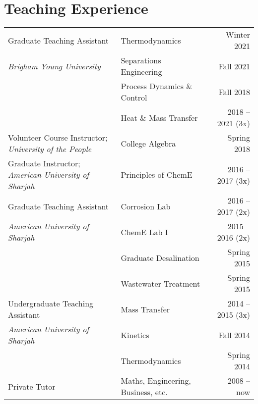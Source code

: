 \documentclass[letterpaper,11pt]{article}
\begin{document}
\section*{Teaching Experience}
\begin{tabular}{@{}p{}p{}r@{}}
     Graduate Teaching Assistant          & Thermodynamics                                      & Winter 2021 \\
      \textit{Brigham Young University}   & Separations Engineering                             & Fall 2021 \\
                                          & Process Dynamics \& Control                         & Fall 2018 \\
                                          & Heat \& Mass Transfer                               & 2018 -- 2021 (3x) \\[4pt]
     Volunteer Course Instructor; \textit{University of the People} & College Algebra           & Spring 2018 \\[4pt]
     Graduate Instructor; \textit{American University of Sharjah}   & Principles of ChemE       & 2016 -- 2017 (3x) \\[4pt]
     Graduate Teaching Assistant          & Corrosion Lab                                       & 2016 -- 2017 (2x) \\
     \textit{American University of Sharjah}                         
                                          & ChemE Lab I                                         & 2015 -- 2016 (2x) \\
                                          & Graduate Desalination                                        & Spring 2015 \\
                                          & Wastewater Treatment                                & Spring 2015 \\[4pt]
     Undergraduate Teaching Assistant     & Mass Transfer                                       & 2014 -- 2015 (3x) \\
     \textit{American University of Sharjah}
                                          & Kinetics                                            & Fall 2014 \\
                                          & Thermodynamics                                      & Spring 2014 \\[4pt]
     Private Tutor                        & Maths, Engineering, Business, etc.                  & 2008 -- now
\end{tabular}
\end{document}
